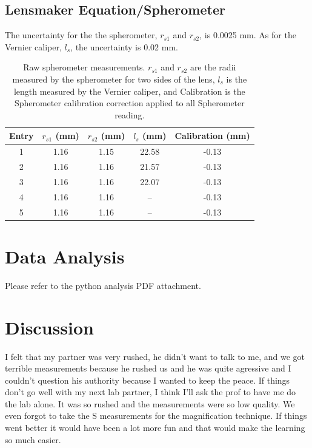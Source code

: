 \documentclass{article}
\begin{document}
\subsection{Lensmaker Equation/Spherometer}
The uncertainty for the the spherometer, $r_{s1}$ and $r_{s2}$, is 0.0025 mm. As for the Vernier caliper, $l_s$, the uncertainty is 0.02 mm.
\begin{table}[H]
    \centering
    \begin{tabular}{ccccc}
        \hline
        Entry & $r_{s1}$ (mm) & $r_{s2}$ (mm) & $l_s$ (mm) & Calibration (mm) \\
        \hline
        1 & 1.16 & 1.15 & 22.58 & -0.13 \\
        2 & 1.16 & 1.16 & 21.57 & -0.13 \\
        3 & 1.16 & 1.16 & 22.07 & -0.13 \\
        4 & 1.16 & 1.16 & --    & -0.13 \\
        5 & 1.16 & 1.16 & --    & -0.13 \\
        \hline
    \end{tabular}
    \caption{Raw spherometer measurements. $r_{s1}$ and $r_{s2}$ are the radii measured by the spherometer for two sides of the lens, 
    $l_s$ is the length measured by the Vernier caliper, 
    and Calibration is the Spherometer calibration correction applied to all Spherometer reading.}
    \label{tab:spherometer}
\end{table}

\section{Data Analysis}
Please refer to the python analysis PDF attachment.

\section{Discussion}
I felt that my partner was very rushed, he didn't 
want to talk to me, and we got terrible measurements 
because he rushed us and he was quite agressive and 
I couldn't question his authority because I wanted 
to keep the peace. If things don't go well with my
next lab partner, I think I'll ask the prof to have
me do the lab alone. It was so rushed and the measurements 
were so low quality. We even forgot to take the S measurements
for the magnification technique. If things went better it would 
have been a lot more fun and that would make the learning so much easier.
\end{document}
